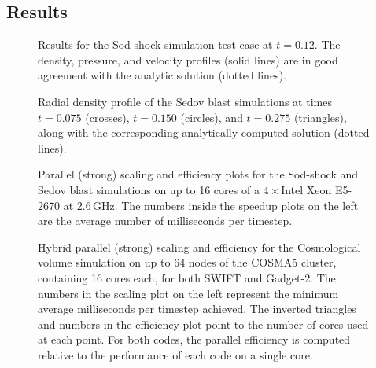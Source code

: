\documentclass[final]{siamltex}
\begin{document}
\subsection{Results}

\begin{figure}
    \centerline{}%
    \caption{Results for the Sod-shock simulation test case at $t=0.12$.
        The density,
        pressure, and velocity profiles (solid lines) are in good agreement with the
        analytic solution (dotted lines).}
    \label{fig:SodShock}
\end{figure}

\begin{figure}
    \centerline{}
    \caption{Radial density profile of the Sedov blast simulations at
        times $t=0.075$ (crosses), $t=0.150$ (circles), and $t=0.275$
        (triangles), along with the corresponding analytically computed solution
        (dotted lines).}
    \label{fig:SedovBlast}
\end{figure}

\begin{figure}
    \centerline{}
    \centerline{}
    \caption{Parallel (strong) scaling and efficiency plots for the Sod-shock and
        Sedov blast simulations on up to 16 cores of a $4\times$Intel Xeon E5-2670
        at 2.6\,GHz. The numbers inside the speedup plots on the left are
        the average number of milliseconds per timestep.}
    \label{fig:Scaling}
\end{figure}

\begin{figure}
    \centerline{}
    \caption{Hybrid parallel (strong) scaling and efficiency for the
        Cosmological volume simulation on up to 64 nodes of the COSMA5
        cluster, containing 16 cores each, for both SWIFT and Gadget-2.
        The numbers in the scaling plot on the left represent the minimum
        average milliseconds per timestep achieved.
        The inverted triangles and numbers in the efficiency plot point to
        the number of cores used at each point.
        For both codes, the parallel efficiency is computed relative to
        the performance of each code on a single core.}
    \label{fig:CosmoVolume}
\end{figure}
\end{document}
